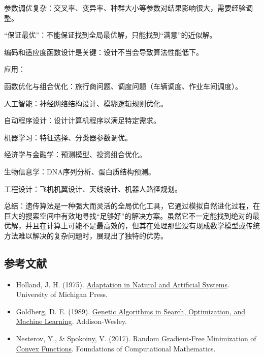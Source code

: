 参数调优复杂：交叉率、变异率、种群大小等参数对结果影响很大，需要经验调整。

``保证最优''：不能保证找到全局最优解，只能找到``满意''的近似解。

编码和适应度函数设计是关键：设计不当会导致算法性能低下。

应用：

函数优化与组合优化：旅行商问题、调度问题（车辆调度、作业车间调度）。

人工智能：神经网络结构设计、模糊逻辑规则优化。

自动程序设计：设计计算机程序以满足特定需求。

机器学习：特征选择、分类器参数调优。

经济学与金融学：预测模型、投资组合优化。

生物信息学：DNA序列分析、蛋白质结构预测。

工程设计：飞机机翼设计、天线设计、机器人路径规划。

总结：遗传算法是一种强大而灵活的全局优化工具，它通过模拟自然进化过程，在巨大的搜索空间中有效地寻找``足够好''的解决方案。虽然它不一定能找到绝对的最优解，并且在计算上可能不是最高效的，但其在处理那些没有现成数学模型或传统方法难以解决的复杂问题时，展现出了独特的优势。

\hypertarget{ux53c2ux8003ux6587ux732e-29}{%
\subsection{参考文献}\label{ux53c2ux8003ux6587ux732e-29}}

\begin{itemize}
\tightlist
\item
  Holland, J. H. (1975). \href{https://openlibrary.org/books/OL5070129M/Adaptation_in_natural_and_artificial_systems}{Adaptation in Natural and Artificial Systems}. University of Michigan Press.
\item
  Goldberg, D. E. (1989). \href{https://openlibrary.org/books/OL2030750M/Genetic_algorithms_in_search_optimization_and_machine_learning}{Genetic Algorithms in Search, Optimization, and Machine Learning}. Addison-Wesley.
\item
  Nesterov, Y., \& Spokoiny, V. (2017). \href{https://doi.org/10.1007/s10208-015-9296-2}{Random Gradient-Free Minimization of Convex Functions}. Foundations of Computational Mathematics.
\end{itemize}

\clearpage

